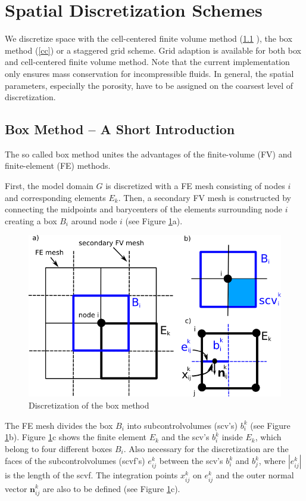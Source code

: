 \section{Spatial Discretization Schemes}
\label{spatialdiscretization}

We discretize space with the cell-centered finite volume method (\ref{box} ), the box method (\ref{cc})
or a staggered grid scheme.
Grid adaption is available for both box and cell-centered finite volume method.
Note that the current implementation only ensures mass conservation for incompressible fluids.
In general, the spatial  parameters, especially the porosity, have to be assigned on
the coarsest level of discretization.

\subsection{Box Method -- A Short Introduction}\label{box}

The so called box method unites the advantages of the finite-volume (FV) and
finite-element (FE) methods.

First, the model domain $G$ is discretized with a FE mesh consisting of nodes
$i$ and corresponding elements $E_k$. Then, a secondary FV mesh is constructed
by connecting the midpoints and barycenters of the elements surrounding node
$i$ creating a box $B_i$ around node $i$ (see Figure \ref{pc:box}a).

\begin{figure} [ht]
\includegraphics[width=0.8\linewidth,keepaspectratio]{PNG/box_disc.png}
\caption{\label{pc:box} Discretization of the box method}
\end{figure}

The FE mesh divides the box $B_i$ into subcontrolvolumes (scv's) $b^k_i$
(see Figure \ref{pc:box}b). Figure \ref{pc:box}c shows the finite element $E_k$
and the scv's $b^k_i$ inside $E_k$, which belong to four different boxes $B_i$.
Also necessary for the discretization are the faces of the subcontrolvolumes (scvf's)
$e^k_{ij}$ between the scv's $b^k_i$ and $b^k_j$, where $|e^k_{ij}|$ is the length
of the scvf. The integration points $x^k_{ij}$ on $e^k_{ij}$ and the outer normal
vector $\mathbf n^k_{ij}$ are also to be defined (see Figure \ref{pc:box}c).

